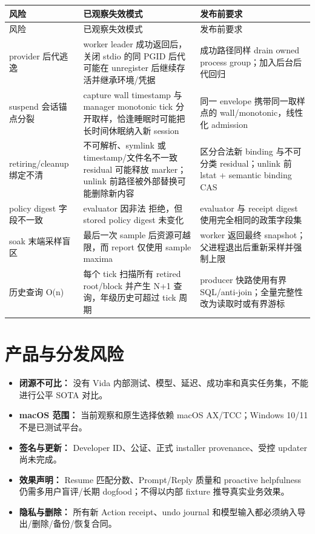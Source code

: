 \documentclass[UTF8,fontset=none,zihao=-4,openany]{ctexrep}
\newcommand{\code}[1]{\texttt{\detokenize{#1}}}
\begin{document}
\begin{longtable}{p{36mm}p{74mm}p{45mm}}
\toprule
风险 & 已观察失效模式 & 发布前要求 \\
\midrule
\endfirsthead
\toprule
风险 & 已观察失效模式 & 发布前要求 \\
\midrule
\endhead
provider 后代逃逸 & worker leader 成功返回后，关闭 stdio 的同 PGID 后代可能在 unregister 后继续存活并继承环境/凭据 & 成功路径同样 drain owned process group；加入后台后代回归 \\
suspend 会话锚点分裂 & capture wall timestamp 与 manager monotonic tick 分开取样，恰逢睡眠时可能把长时间休眠纳入新 session & 同一 envelope 携带同一取样点的 wall/monotonic，线性化 admission \\
retiring/cleanup 绑定不清 & 不可解析、symlink 或 timestamp/文件名不一致 residual 可能释放 marker；unlink 前路径被外部替换可能删除新内容 & 区分合法新 binding 与不可分类 residual；unlink 前 lstat + semantic binding CAS \\
policy digest 字段不一致 & evaluator 因非法 \code{include_screenshot} 拒绝，但 stored policy digest 未变化 & evaluator 与 receipt digest 使用完全相同的政策字段集 \\
soak 末端采样盲区 & 最后一次 sample 后资源可越限，而 report 仅使用 sample maxima & worker 返回最终 snapshot；父进程退出后重新采样并强制上限 \\
历史查询 O(n) & 每个 tick 扫描所有 retired root/block 并产生 N+1 查询，年级历史可超过 tick 周期 & producer 快路使用有界 SQL/anti-join；全量完整性改为读取时或有界游标 \\
\bottomrule
\end{longtable}

\section{产品与分发风险}

\begin{itemize}
  \item \textbf{闭源不可比：} 没有 Vida 内部测试、模型、延迟、成功率和真实任务集，不能进行公平 SOTA 对比。
  \item \textbf{macOS 范围：} 当前观察和原生选择依赖 macOS AX/TCC；Windows 10/11 不是已测试平台。
  \item \textbf{签名与更新：} Developer ID、公证、正式 installer provenance、受控 updater 尚未完成。
  \item \textbf{效果声明：} Resume 匹配分数、Prompt/Reply 质量和 proactive helpfulness 仍需多用户盲评/长期 dogfood；不得以内部 fixture 推导真实业务效果。
  \item \textbf{隐私与删除：} 所有新 Action receipt、undo journal 和模型输入都必须纳入导出/删除/备份/恢复合同。
\end{itemize}
\end{document}
